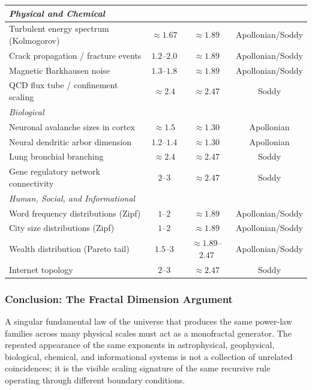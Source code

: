 \documentclass[11pt,a4paper]{article}
\begin{document}
\begin{longtable}{p{6.8cm}ccc}
\midrule
\multicolumn{4}{l}{\textit{Physical and Chemical}} \\
\midrule
Turbulent energy spectrum (Kolmogorov) & $\approx1.67$ & $\approx1.89$ & Apollonian/Soddy \\
Crack propagation / fracture events & $1.2$--$2.0$ & $\approx1.89$ & Apollonian/Soddy \\
Magnetic Barkhausen noise & $1.3$--$1.8$ & $\approx1.89$ & Apollonian/Soddy \\
QCD flux tube / confinement scaling & $\approx2.4$ & $\approx2.47$ & Soddy \\

\midrule
\multicolumn{4}{l}{\textit{Biological}} \\
\midrule
Neuronal avalanche sizes in cortex & $\approx1.5$ & $\approx1.30$ & Apollonian \\
Neural dendritic arbor dimension & $1.2$--$1.4$ & $\approx1.30$ & Apollonian \\
Lung bronchial branching & $\approx2.4$ & $\approx2.47$ & Soddy \\
Gene regulatory network connectivity & $2$--$3$ & $\approx2.47$ & Soddy \\

\midrule
\multicolumn{4}{l}{\textit{Human, Social, and Informational}} \\
\midrule
Word frequency distributions (Zipf) & $1$--$2$ & $\approx1.89$ & Apollonian/Soddy \\
City size distributions (Zipf) & $1$--$2$ & $\approx1.89$ & Apollonian/Soddy \\
Wealth distribution (Pareto tail) & $1.5$--$3$ & $\approx1.89$--$2.47$ & Apollonian/Soddy \\
Internet topology & $2$--$3$ & $\approx2.47$ & Soddy \\
\end{longtable}

\subsubsection{Conclusion: The Fractal Dimension Argument}

A singular fundamental law of the universe that produces the same power-law families across many physical scales must act as a monofractal generator. The repeated appearance of the same exponents in astrophysical, geophysical, biological, chemical, and informational systems is not a collection of unrelated coincidences; it is the visible scaling signature of the same recursive rule operating through different boundary conditions.
\end{document}
